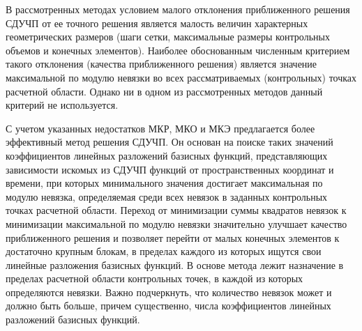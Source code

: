 \documentclass[a4paper,11pt,numreferences,mathsec,kaplist]{isuepsutf8}
\begin{document}
\begin{article}
В рассмотренных методах условием малого отклонения приближенного решения
СДУЧП от ее точного решения является малость величин характерных
геометрических размеров (шаги сетки, максимальные размеры контрольных
объемов и конечных элементов). Наиболее обоснованным численным критерием
такого отклонения (качества приближенного решения) является значение
максимальной по модулю невязки во всех рассматриваемых (контрольных) точках
расчетной области. Однако ни в одном из рассмотренных методов данный
критерий не используется. 

С учетом указанных недостатков МКР, МКО и МКЭ предлагается более
эффективный метод решения СДУЧП. Он основан на поиске таких значений
коэффициентов линейных разложений базисных функций, представляющих
зависимости искомых из СДУЧП функций от пространственных координат и
времени, при которых минимального значения достигает максимальная по модулю
невязка, определяемая среди всех невязок в заданных контрольных точках
расчетной области. Переход от минимизации суммы квадратов невязок к
минимизации максимальной по модулю невязки значительно улучшает качество
приближенного решения и позволяет перейти от малых конечных элементов к
достаточно крупным блокам, в пределах каждого из которых ищутся свои
линейные разложения базисных функций. В основе метода лежит назначение в
пределах расчетной области контрольных точек, в каждой из которых
определяются невязки. Важно подчеркнуть, что количество невязок может
и должно быть больше, причем существенно, числа коэффициентов линейных
разложений базисных функций.


\end{article}
\end{document}
